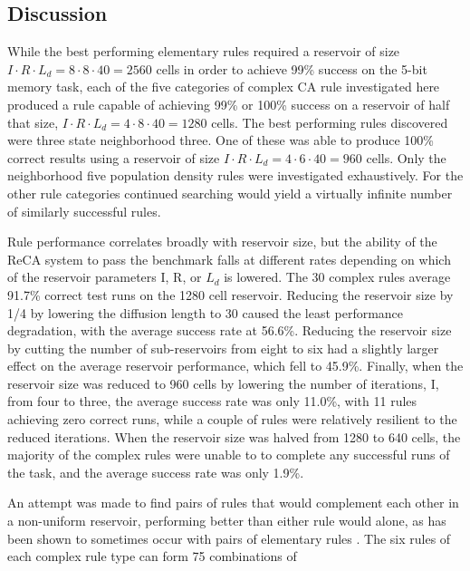 \documentclass{elsarticle}
\begin{document}
\begin{multicols}{2}
\section{Discussion}\label{discussion}
While the best performing elementary rules required a reservoir of size $I \cdot R 
\cdot L_{d} = 8 \cdot 8 \cdot 40 = 2560$ cells in order to achieve 99\% success on the 
5-bit memory task, each of the five categories of complex CA rule investigated 
here produced a rule capable of achieving 99\% or 100\% success on a reservoir 
of half that size, $I \cdot R \cdot L_{d} = 4 \cdot 8 \cdot 40 = 1280$ cells. The best 
performing rules discovered were three state neighborhood three. One of these 
was able to produce 100\% correct results using a reservoir of size $I \cdot R \cdot 
L_{d} = 4 \cdot 6 \cdot 40 = 960$ cells. Only the neighborhood five population density 
rules were investigated exhaustively.  For the other rule categories continued 
searching would yield a virtually infinite number of similarly successful 
rules. \par Rule performance correlates broadly with reservoir size, but the 
ability of the ReCA system to  pass the benchmark falls at different rates 
depending on which of the reservoir parameters I, R, or $L_{d}$ is lowered. The 
30 complex rules average 91.7\% correct test runs on the 1280 cell reservoir.  
Reducing the reservoir size by 1/4 by lowering the diffusion length to 30 
caused the least performance degradation, with the average success rate at 
56.6\%. Reducing the reservoir size by cutting the number of sub-reservoirs 
from eight to six had a slightly larger effect on the average reservoir 
performance, which fell to 45.9\%.  Finally, when the reservoir size was 
reduced to 960 cells by lowering the number of iterations, I, from four to 
three, the average success rate was only 11.0\%, with 11 rules achieving zero 
correct runs, while a  couple of rules were  relatively resilient to the 
reduced iterations. When the reservoir size was halved from 1280 to 640  cells, 
        the majority of the complex rules were unable to to complete any 
            successful runs of the task, and the average success rate was only 
            1.9\%. \par An attempt was made to find pairs of rules that would 
            complement each other in a non-uniform reservoir, performing better 
            than either rule would alone, as has been shown to sometimes occur 
            with pairs of elementary rules \cite{nichele2017reservoir}. The six 
            rules of each complex rule type can form 75 combinations of 

\end{multicols}
\end{document}
